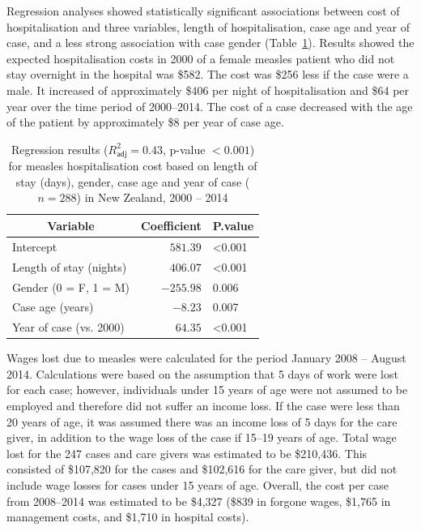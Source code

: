 \documentclass{article}
\begin{document}
\begin{itemize}
Regression analyses showed statistically significant associations between cost of hospitalisation and three variables, length of hospitalisation, case age and year of case, and a less strong association with case gender (Table~\ref{table:regression}). Results showed the expected hospitalisation costs in 2000 of a female measles patient who did not stay overnight in the hospital was \$582.  The cost was \$256 less if the case were a male. It increased of approximately \$406 per night of hospitalisation and \$64 per year over the time period of 2000--2014. The cost of a case decreased with the age of the patient by approximately \$8 per year of case age.


\begin{table}
\caption{Regression results ($R^{2}_\textsf{adj} = 0.43$, p-value $<0.001$) for measles hospitalisation cost based on length of stay (days), gender, case age and year of case ($n=288$) in New Zealand, 2000 -- 2014}
\begin{center}
\begin{tabular}{lrl}
\hline\hline
\multicolumn{1}{c}{Variable}&\multicolumn{1}{c}{Coefficient}&\multicolumn{1}{c}{P.value}\tabularnewline
\hline
Intercept&$ 581.39$&\textless 0.001\tabularnewline
Length of stay (nights)&$ 406.07$&\textless 0.001\tabularnewline
Gender (0 = F, 1 = M)&$-255.98$&0.006\tabularnewline
Case age (years)&$  -8.23$&0.007\tabularnewline
Year of case (vs. 2000)&$  64.35$&\textless 0.001\tabularnewline
\hline
\end{tabular}\end{center}\label{table:regression}
\end{table}

Wages lost due to measles were calculated for the period January 2008 -- August 2014. Calculations were based on the assumption that 5 days of work were lost for each case; however, individuals under 15 years of age were not assumed to be employed and therefore did not suffer an income loss. If the case were less than 20 years of age, it was assumed there was an income loss of 5 days for the care giver, in addition to the wage loss of the case if 15--19 years of age. Total wage lost for the 247 cases and care givers was estimated to be \$210,436. This consisted of \$107,820 for the cases and \$102,616 for the care giver, but did not include wage losses for cases under 15 years of age. Overall, the cost per case from 2008--2014 was estimated to be \$4,327 (\$839 in forgone wages, \$1,765 in management costs, and \$1,710 in hospital costs).


\end{itemize}
\end{document}
